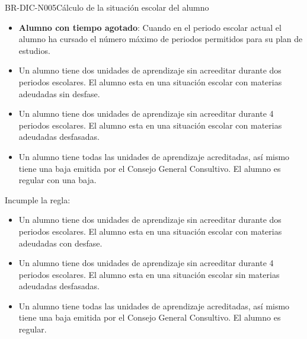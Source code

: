 \begin{BusinessRule}{BR-DIC-N005}{Cálculo de la situación escolar del alumno}{\bcAutorization}
\begin{itemize}
		\item \textbf{Alumno con tiempo agotado}: Cuando en el periodo escolar actual el alumno ha cursado el número máximo de periodos permitidos para su plan de estudios.
			\end{itemize}
	\begin{itemize}
		\item Un alumno tiene dos unidades de aprendizaje sin acreeditar durante dos periodos escolares. El alumno esta en una situación escolar con materias adeudadas sin desfase.
		\item Un alumno tiene dos unidades de aprendizaje sin acreeditar durante 4 periodos escolares. El alumno esta en una situación escolar con materias adeudadas desfasadas.
		\item Un alumno tiene todas las unidades de aprendizaje acreditadas, así mismo tiene una baja emitida por el Consejo General Consultivo. El alumno es regular con una baja.
	\end{itemize}

	 	Incumple la regla:
	
	\begin{itemize}

		\item Un alumno tiene dos unidades de aprendizaje sin acreeditar durante dos periodos escolares. El alumno esta en una situación escolar con materias adeudadas con desfase.
		\item Un alumno tiene dos unidades de aprendizaje sin acreeditar durante 4 periodos escolares. El alumno esta en una situación escolar sin materias adeudadas desfasadas.
		\item Un alumno tiene todas las unidades de aprendizaje acreditadas, así mismo tiene una baja emitida por el Consejo General Consultivo. El alumno es regular.
	\end{itemize}
\end{BusinessRule}

